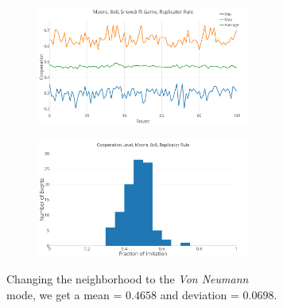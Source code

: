 \documentclass[a4paper, 11pt]{article}
\begin{document}
\begin{figure}[H]
\begin{subfigure}{.55\textwidth}
	\begin{subfigure}{1\textwidth}
		\includegraphics[width=1\linewidth]{SDMoore8x8}
	\end{subfigure}

	\begin{subfigure}{1\textwidth}
		\includegraphics[width=1\linewidth]{SDMoore8x8HG}
	\end{subfigure}
\end{subfigure}%
\begin{subfigure}{.45\textwidth}
	Changing the neighborhood to the \textit{Von Neumann} mode, we get a mean = $0.4658$ and deviation = $0.0698$.
\end{subfigure}

\end{figure}



\newpage
\end{document}
